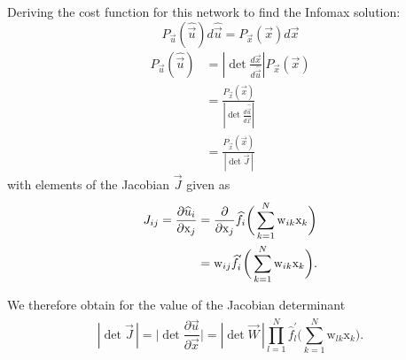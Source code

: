 \begin{frame}

Deriving the cost function for this network to find the Infomax solution:
\begin{equation}
\label{eq:conservationvec}
	P_{\vec{u}} (\widehat{\vec{u}}) d \widehat{\vec{u}}
		= P_{\vec{x}}(\vec{x}) d \vec{x}
\end{equation}
\begin{align}
\label{eq:uxj}
	P_{\vec{u}} (\widehat{\vec{u}}) 
	& = \left| \det \frac{d \vec{x}}{d \widehat{\vec{u}}} \right|
		P_{\vec{x}}(\vec{x}) \\
	& = \frac{P_{\vec{x}}(\vec{x})}{ \left| \det
		\frac{d \widehat{\vec{u}}}{d \vec{x}} \right|}\\
    & = \frac{P_{\vec{x}}(\vec{x})}{|\det \vec{J}\,|}
\end{align}
with elements of the Jacobian $\vec J$ given as
\slidesonly{
	\begingroup
	\small
}
\begin{align}
\label{eq:jacobelement}
 J_{ij}=
 \frac{\partial \widehat{u}_i}{\partial \mathrm{x}_j}
	& = \frac{\partial}{\partial \mathrm{x}_j} 
		\widehat{f}_i \bigg( \sum\limits_{k = 1}^N \mathrm{w}_{ik} 
		\mathrm{x}_k \bigg) \\
	& = \mathrm{w}_{ij} \widehat{f}_i^{'} \bigg( \sum\limits_{k = 1}^N 
		\mathrm{w}_{ik} \mathrm{x}_k \bigg).
\end{align}
\slidesonly{
	\endgroup
}

We therefore obtain for the value of the Jacobian determinant
\slidesonly{
	\begingroup
	\footnotesize
}
\begin{equation} \label{eq:functionalDeterminant}
|\det \vec {J}\,| = 
	\Big| \det \frac{\partial \widehat{\vec{u}}}{\partial \vec{x}} \Big|
	= |\det \vec{W}\, | \prod\limits_{l = 1}^N  \widehat{f}_l^{'} \Bigg( 
		\sum\limits_{k = 1}^N \mathrm{w}_{lk} \mathrm{x}_k \Bigg).
\end{equation}
\slidesonly{
	\endgroup
}

\end{frame}

\clearpage

